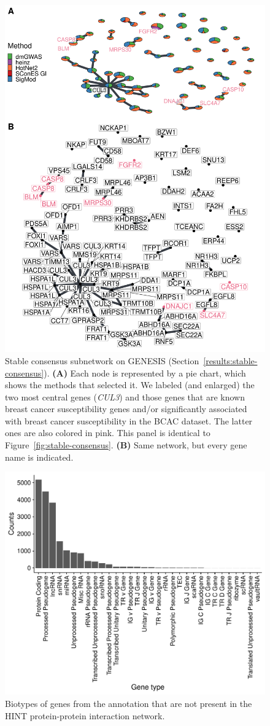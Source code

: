 \documentclass[twocolumn, 11pt]{article}
\begin{document}
\begin{figure}[htbp]
  \centering
  \includegraphics[width=.675\linewidth]{./figures/sfigure_6.pdf}
  \caption{Stable consensus subnetwork on GENESIS (Section~\ref{results:stable-consensus}). \textbf{(A)} Each node is represented by a pie chart, which shows the methods that selected it. We labeled (and enlarged) the two most central genes (\emph{CUL3}) and those genes that are known breast cancer susceptibility genes and/or significantly associated with breast cancer susceptibility in the BCAC dataset. The latter ones are also colored in pink. This panel is identical to Figure~\ref{fig:stable-consensus}. \textbf{(B)} Same network, but every gene name is indicated.}
  \label{sfig:stable-consensus-names}
\end{figure}

\begin{figure}[htbp]
\centering
\includegraphics[width=.9\linewidth]{./figures/sfigure_7.pdf}
\caption{Biotypes of genes from the annotation that are not present in the HINT protein-protein interaction network.}
\label{sfig:biotypes_excluded}
\end{figure}
\end{document}

